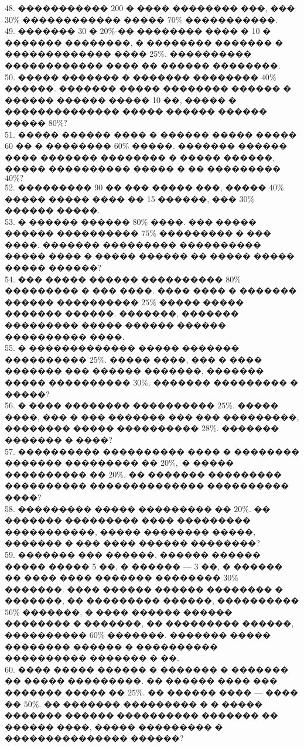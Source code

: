 \documentclass[12pt]{article}
\begin{document}
48. ����������� 200 � ���� �������� ���, ��� $30\%$ ������������ ����� $70\%$ �����������.\\
49. ������� 30 � 20$\%$-�� �������� ���� � 10 � ������� ��������, � �������� ������� � ������������� ���� 25$\%$. ���������� ������������ ���� �� ������ ��������.\\
50. ����� ������� � ������� �������� $40\%$ ������. ������� ����� �������� ������ � ������ ������ ����� 10 ��, ����� � �������������� ����� ������ ������ ����� $80\%?$\\
51. ����� ������ ���� � ������ ����� ����� 60 �� � �������� $60\%$ �����. ������� ������ ���� ������� �������� � ����� ������, ����� ���������� ����� � �� ��������� $40\%?$\\
52. ��������� 90 �� ��� ����� ���, ����� $40\%$ ����� ����� ���� �� 15 ������, ��� $30\%$ ������ �����.\\
53. � ������ ������ $80\%$ ����. ��� ����� ������ ���������� $75\%$ ��������� � ��� ����. ������� ��������� ���������� ����� ���� � ����� ������ �� ����� ����� ����� ������?\\
54. ��� ����� ������ ���������� $80\%$ ��������� � ��� ����. ���� ���� � ������� ������ ���������� $25\%$ ����� ����� ������� ������. �������, ������� ��������� ����� ������ ������ ���������� ����.\\
55. � ������������� ����� ������� ���������� $25\%.$ ����� ����, ��� � ���� ������� ��� ������ �������, ������� ����� ���������� $30\%.$ ������� ��������� � �����?\\
56. � ���� �������� ���������� $25\%.$ ����� ����, ��� � ��� ������� ��� ��� ���������, �������� ����� ���������� $28\%.$ ������� ������� � ����?\\
57. ���������� ���������� ���� � �������� ������� ��������� �� $20\%,$ � ����� ���������� �� $20\%.$ �� ������� ��������� ���������� �������������� ���������� ����?\\
58. ��������� ����� ��������� �� $20\%.$ �� ������� ��������� ���� ��������� �����������, ����� �������� �����, ������� � ��� ���� ������ ��������?\\
59. ������� ��� ������. ������ ������ ����� ����� 5 ��, � ������ --- 3 ��, � ������ �� ���� ���� ������� �������� $30\%$ �������. ���� ������ ������ �������� � �������, �� ��������� ������, ���������� $56\%$ �������, � ���� ������ ������ �������� � �������, �� ��������� ������, ���������� $60\%$ �������. ������� ����� �������� ������ � ���������� ���������� ������� � ��.\\
60. ���� ����� ������ � ������� � ������� �� ����� ���������. �� ������ ���� ��� ������� ����� �� $25\%.$ �� ������ ���� --- ���� �� $50\%.$ �� ������� ��������� � � ����� ������� ������ ���������� ������� �� ������ ����, ����� ��������� � ��������������� ������?\\
\end{document}
